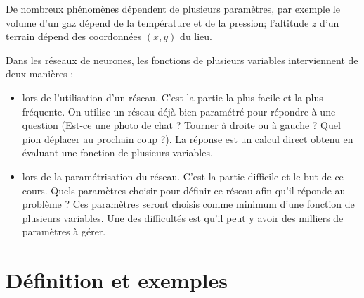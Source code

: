 \documentclass[11pt,class=report,crop=false]{standalone}
\begin{document}








De nombreux phénomènes dépendent de plusieurs paramètres, par exemple le volume d'un gaz dépend de la température et de la pression; l'altitude $z$ d'un terrain dépend des coordonnées $(x,y)$ du lieu.

Dans les réseaux de neurones, les fonctions de plusieurs variables interviennent de deux manières :
\begin{itemize}
  \item lors de l'utilisation d'un réseau. C'est la partie la plus facile et la plus fréquente. On utilise un réseau déjà bien paramétré pour répondre à une question (Est-ce une photo de chat ? Tourner à droite ou à gauche ? Quel pion déplacer au prochain coup ?). La réponse est un calcul direct obtenu en évaluant une fonction de plusieurs variables. 
  
  \item lors de la paramétrisation du réseau. C'est la partie difficile et le but de ce cours. Quels paramètres choisir pour définir ce réseau afin qu'il réponde au problème ? Ces paramètres seront choisis comme minimum d'une fonction de plusieurs variables. Une des difficultés est qu'il peut y avoir des milliers de paramètres à gérer.
  
\end{itemize}




\section{Définition et exemples}
\end{document}
